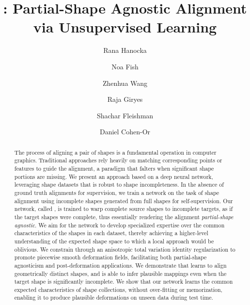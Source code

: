 \documentclass[acmtog,timestamp]{acmart}%
\begin{document}
\title{: Partial-Shape Agnostic Alignment via Unsupervised Learning}


\author{Rana Hanocka}

\author{Noa Fish}

\author{Zhenhua Wang}

\author{Raja Giryes}

\author{Shachar Fleishman}


\author{Daniel Cohen-Or}


\begin{abstract}
The process of aligning a pair of shapes is a fundamental operation in computer graphics. Traditional approaches rely heavily on matching corresponding points or features to guide the alignment, a paradigm that falters when significant shape portions are missing. 
We present an approach based on a deep neural network, leveraging shape datasets 
that is robust to shape incompleteness.
In the absence of ground truth alignments for supervision, we train a network on the task of shape alignment using incomplete shapes generated from full shapes for self-supervision.
Our network, called \emph{\ourmethod{}}, is trained to warp complete source shapes to incomplete targets, as if the target shapes were complete, thus essentially rendering the alignment \emph{partial-shape agnostic}.
We aim for the network to develop specialized expertise over the common characteristics of the shapes in each dataset, thereby achieving a higher-level understanding of the expected shape space to which a local approach would be oblivious.
We constrain \emph{\ourmethod{}} through an anisotropic total variation identity regularization to promote piecewise smooth deformation fields, facilitating both partial-shape agnosticism and post-deformation applications. We demonstrate that \emph{\ourmethod{}} learns to align geometrically distinct shapes, and is able to infer plausible mappings even when the target shape is significantly incomplete. We show that our network learns the common expected characteristics of shape collections, without over-fitting or memorization, enabling it to produce plausible deformations on unseen data during test time.


\end{abstract}
\end{document}
